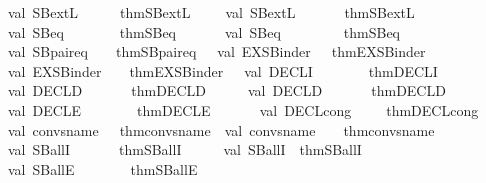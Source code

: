 \begin{isabellebody}
val\ SB{}{\isacharunderscore}extL\ \ \ \ \ {\isacharequal}\ thm{\isachardoublequote}SB{}{\isacharunderscore}extL{\isachardoublequote}\ \ \ \ \ val\ SB{\isacharunderscore}extL\ \ \ \ \ \ {\isacharequal}\ thm{\isachardoublequote}SB{\isacharunderscore}extL{\isachardoublequote}\isanewline
val\ SB{}{\isacharunderscore}eq\ \ \ \ \ \ \ {\isacharequal}\ thm{\isachardoublequote}SB{}{\isacharunderscore}eq{\isachardoublequote}\ \ \ \ \ \ \ val\ SB{\isacharunderscore}eq\ \ \ \ \ \ \ \ {\isacharequal}\ thm{\isachardoublequote}SB{\isacharunderscore}eq{\isachardoublequote}\isanewline
val\ SB{\isacharunderscore}pair{\isacharunderscore}eq\ \ \ {\isacharequal}\ thm{\isachardoublequote}SB{\isacharunderscore}pair{\isacharunderscore}eq{\isachardoublequote}\ \ \ val\ EX{\isacharunderscore}SBinder{}\ \ {\isacharequal}\ thm{\isachardoublequote}EX{\isacharunderscore}SBinder{}{\isachardoublequote}\isanewline
val\ EX{\isacharunderscore}SBinder\ \ \ {\isacharequal}\ thm{\isachardoublequote}EX{\isacharunderscore}SBinder{\isachardoublequote}\ \ \ val\ DECL{\isacharunderscore}I\ \ \ \ \ \ \ {\isacharequal}\ thm{\isachardoublequote}DECL{\isacharunderscore}I{\isachardoublequote}\isanewline
val\ DECL{\isacharunderscore}D{}\ \ \ \ \ \ {\isacharequal}\ thm{\isachardoublequote}DECL{\isacharunderscore}D{}{\isachardoublequote}\ \ \ \ \ \ val\ DECL{\isacharunderscore}D{}\ \ \ \ \ \ {\isacharequal}\ thm{\isachardoublequote}DECL{\isacharunderscore}D{}{\isachardoublequote}\isanewline
val\ DECL{\isacharunderscore}E\ \ \ \ \ \ \ {\isacharequal}\ thm{\isachardoublequote}DECL{\isacharunderscore}E{\isachardoublequote}\ \ \ \ \ \ \ val\ DECL{\isacharunderscore}cong\ \ \ \ {\isacharequal}\ thm{\isachardoublequote}DECL{\isacharunderscore}cong{\isachardoublequote}\isanewline
\isanewline
val\ conv{\isacharunderscore}sname{}\ \ {\isacharequal}\ thm{\isachardoublequote}conv{\isacharunderscore}sname{}{\isachardoublequote}\ \ val\ conv{\isacharunderscore}sname\ \ \ {\isacharequal}\ thm{\isachardoublequote}conv{\isacharunderscore}sname{\isachardoublequote}\isanewline
val\ SBall{\isacharunderscore}I\ \ \ \ \ \ {\isacharequal}\ thm{\isachardoublequote}SBall{\isacharunderscore}I{\isachardoublequote}\ \ \ \ \ \ val\ SBall{\isacharunderscore}I{}\ {\isacharequal}\ thm{\isachardoublequote}SBall{\isacharunderscore}I{}{\isachardoublequote}\ \isanewline
val\ SBallE\ \ \ \ \ \ \ {\isacharequal}\ thm{\isachardoublequote}SBall{\isacharunderscore}E{\isachardoublequote}\isanewline

\end{isabellebody}
